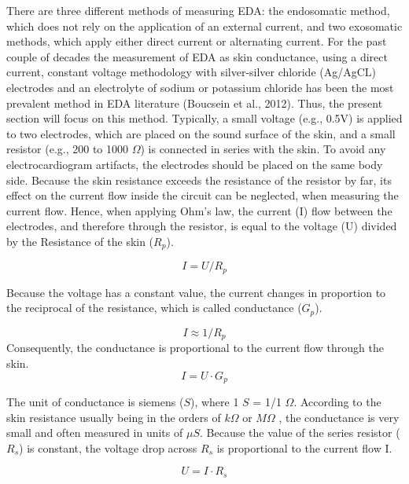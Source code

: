 There are three different methods of measuring EDA: the endosomatic method, which does not rely on the application of an external current, and two exosomatic methods, which apply either direct current or alternating current. For the past couple of decades the measurement of EDA as skin conductance, using a direct current, constant voltage methodology with silver-silver chloride (Ag/AgCL) electrodes and an electrolyte of sodium or potassium chloride has been the most prevalent method in EDA literature (Boucsein et al., 2012). Thus, the present section will focus on this method. Typically, a small voltage (e.g., 0.5V) is applied to two electrodes, which are placed on the sound surface of the skin, and a small resistor (e.g., 200 to 1000 $\Omega$) is connected in series with the skin.  To avoid any electrocardiogram artifacts, the electrodes should be placed on the same body side. Because the skin resistance exceeds the resistance of the resistor by far, its   effect on the current flow inside the circuit can be neglected, when measuring the current flow. Hence, when applying Ohm's law, the current (I) flow between the electrodes, and therefore through the resistor, is equal to the voltage (U) divided by the Resistance of the skin ($R_{p}$).

\begin{equation} \label{OhmsLaw}
I = U / R_{p}
\end{equation}

Because the voltage has a constant value, the current changes in proportion to the reciprocal of the resistance, which is called conductance ($G_{p}$).  

\begin{equation}
I \approx 1/R_{p} 
\end{equation}
Consequently, the conductance is proportional to the current flow through the skin.
\begin{equation} \label{IG}
I = U \cdot G_{p}
\end{equation}

The unit of conductance is siemens ($S$), where 1 $S$ = 1/1 $\Omega$. According to the skin resistance usually being in the orders of $k\Omega$ or $M\Omega$ , the conductance is very small and often measured in units of $\mu S$. Because the value of the series resistor ($R_{s}$) is constant, the voltage drop across $R_{s}$ is proportional to the current flow I. 

\begin{equation}
U = I \cdot R_{s}
\end{equation}

